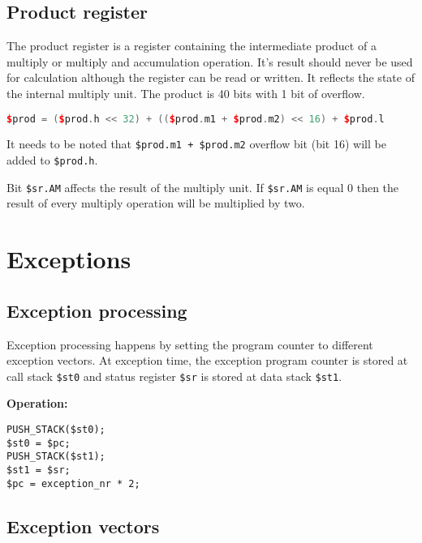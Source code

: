 \documentclass[oneside,english,a4paper,10pt,oneside,openany,final]{memoir}
\newcommand{\InlineExpression}[1]{\texttt{#1}}
\newcommand{\Register}[1]{\texttt{#1}}
\newcommand{\RegisterField}[1]{\texttt{#1}}
\begin{document}
\pagebreak{}

\section{Product register}

The product register is a register containing the intermediate product of a multiply or multiply and accumulation operation.
It's result should never be used for calculation although the register can be read or written.
It reflects the state of the internal multiply unit. The product is 40 bits with 1 bit of overflow.

\begin{lstlisting}[language=C++]
$prod = ($prod.h << 32) + (($prod.m1 + $prod.m2) << 16) + $prod.l
\end{lstlisting}

It needs to be noted that \InlineExpression{\$prod.m1 + \$prod.m2} overflow bit (bit 16) will be added to \Register{\$prod.h}.

Bit \RegisterField{\$sr.AM} affects the result of the multiply unit.
If \RegisterField{\$sr.AM} is equal 0 then the result of every multiply operation will be multiplied by two.

\pagebreak{}

\chapter{Exceptions}

\section{Exception processing}

Exception processing happens by setting the program counter to different exception vectors.
At exception time, the exception program counter is stored at call stack \Register{\$st0} and status register \Register{\$sr} is stored at data stack \Register{\$st1}.

\textbf{Operation:}
\begin{lstlisting}[basicstyle=\ttfamily]
PUSH_STACK($st0);
$st0 = $pc;
PUSH_STACK($st1);
$st1 = $sr;
$pc = exception_nr * 2;
\end{lstlisting}

\pagebreak{}

\section{Exception vectors}
\end{document}
